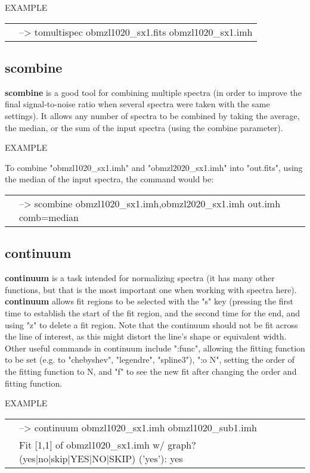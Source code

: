 EXAMPLE

\begin{tabular}{ll}
& {\color{RoyalBlue}--> tomultispec obmzl1020\_sx1.fits obmzl1020\_sx1.imh}
\end{tabular}

\subsection{{\bf scombine}}
{\bf scombine} is a good tool for combining multiple spectra (in order to improve the final signal-to-noise ratio when several spectra were taken with the same settings). It allows any number of spectra to be combined by taking the average, the median, or the sum of the input spectra (using the combine parameter). 

EXAMPLE

To combine "obmzl1020\_sx1.imh" and "obmzl2020\_sx1.imh" into "out.fits", using the median of the input spectra, the command would be:

\begin{tabular}{ll}
& {\color{RoyalBlue} --> scombine obmzl1020\_sx1.imh,obmzl2020\_sx1.imh out.imh comb=median}
\end{tabular}

\subsection{{\bf continuum}}

{\bf continuum} is a task intended for normalizing spectra (it has many other functions, but that is the most important one when working with spectra here). {\bf continuum} allows fit regions to be selected with the "s" key (pressing the first time to establish the start of the fit region, and the second time for the end, and using "z" to delete a fit region. Note that the continuum should not be fit across the line of interest, as this might distort the line's shape or equivalent width.
Other useful commands in continuum include ":func", allowing the fitting function to be set (e.g. to "chebyshev", "legendre", "spline3"), ":o N", setting the order of the fitting function to N, and "f" to see the new fit after changing the order and fitting function.

EXAMPLE

\begin{tabular}{ll}
&{\color{RoyalBlue} --> continuum obmzl1020\_sx1.imh obmzl1020\_sub1.imh} \\
& {\color{Green}Fit [1,1] of obmzl1020\_sx1.imh w/ graph? (yes|no|skip|YES|NO|SKIP) ('yes'): yes}
\end{tabular}

